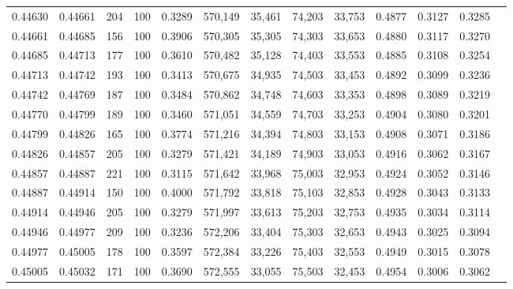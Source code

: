 \begin{tabular}{rrrrrrrrrrrrr}
0.44630 & 0.44661 &    204 & 100 &                                     0.3289 & 570,149 &  35,461 &  74,203 &  33,753 & 0.4877 & 0.3127 & 0.3285 \\
0.44661 & 0.44685 &    156 & 100 &                                     0.3906 & 570,305 &  35,305 &  74,303 &  33,653 & 0.4880 & 0.3117 & 0.3270 \\
0.44685 & 0.44713 &    177 & 100 &                                     0.3610 & 570,482 &  35,128 &  74,403 &  33,553 & 0.4885 & 0.3108 & 0.3254 \\
0.44713 & 0.44742 &    193 & 100 &                                     0.3413 & 570,675 &  34,935 &  74,503 &  33,453 & 0.4892 & 0.3099 & 0.3236 \\
0.44742 & 0.44769 &    187 & 100 &                                     0.3484 & 570,862 &  34,748 &  74,603 &  33,353 & 0.4898 & 0.3089 & 0.3219 \\
0.44770 & 0.44799 &    189 & 100 &                                     0.3460 & 571,051 &  34,559 &  74,703 &  33,253 & 0.4904 & 0.3080 & 0.3201 \\
0.44799 & 0.44826 &    165 & 100 &                                     0.3774 & 571,216 &  34,394 &  74,803 &  33,153 & 0.4908 & 0.3071 & 0.3186 \\
0.44826 & 0.44857 &    205 & 100 &                                     0.3279 & 571,421 &  34,189 &  74,903 &  33,053 & 0.4916 & 0.3062 & 0.3167 \\
0.44857 & 0.44887 &    221 & 100 &                                     0.3115 & 571,642 &  33,968 &  75,003 &  32,953 & 0.4924 & 0.3052 & 0.3146 \\
0.44887 & 0.44914 &    150 & 100 &                                     0.4000 & 571,792 &  33,818 &  75,103 &  32,853 & 0.4928 & 0.3043 & 0.3133 \\
0.44914 & 0.44946 &    205 & 100 &                                     0.3279 & 571,997 &  33,613 &  75,203 &  32,753 & 0.4935 & 0.3034 & 0.3114 \\
0.44946 & 0.44977 &    209 & 100 &                                     0.3236 & 572,206 &  33,404 &  75,303 &  32,653 & 0.4943 & 0.3025 & 0.3094 \\
0.44977 & 0.45005 &    178 & 100 &                                     0.3597 & 572,384 &  33,226 &  75,403 &  32,553 & 0.4949 & 0.3015 & 0.3078 \\
0.45005 & 0.45032 &    171 & 100 &                                     0.3690 & 572,555 &  33,055 &  75,503 &  32,453 & 0.4954 & 0.3006 & 0.3062 \\

\end{tabular}
